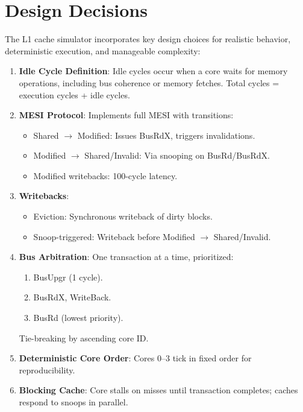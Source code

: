 \documentclass[11pt]{article}
\begin{document}

\section{Design Decisions}\nopagebreak
The L1 cache simulator incorporates key design choices for realistic behavior, deterministic execution, and manageable complexity:

\begin{enumerate}
    \item \textbf{Idle Cycle Definition}: Idle cycles occur when a core waits for memory operations, including bus coherence or memory fetches. Total cycles = execution cycles + idle cycles.
    \item \textbf{MESI Protocol}: Implements full MESI with transitions:
        \begin{itemize}
            \item Shared $\to$ Modified: Issues BusRdX, triggers invalidations.
            \item Modified $\to$ Shared/Invalid: Via snooping on BusRd/BusRdX.
            \item Modified writebacks: 100-cycle latency.
        \end{itemize}
    \item \textbf{Writebacks}:
        \begin{itemize}
            \item Eviction: Synchronous writeback of dirty blocks.
            \item Snoop-triggered: Writeback before Modified $\to$ Shared/Invalid.
        \end{itemize}
    \item \textbf{Bus Arbitration}: One transaction at a time, prioritized:
        \begin{enumerate}
            \item BusUpgr (1 cycle).
            \item BusRdX, WriteBack.
            \item BusRd (lowest priority).
        \end{enumerate}
        Tie-breaking by ascending core ID.
    \item \textbf{Deterministic Core Order}: Cores 0–3 tick in fixed order for reproducibility.
    \item \textbf{Blocking Cache}: Core stalls on misses until transaction completes; caches respond to snoops in parallel.

\end{enumerate}
\end{document}
